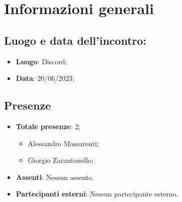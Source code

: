 \section{Informazioni generali}
    \subsection{Luogo e data dell'incontro:}
    \begin{itemize}
        \item \textbf{Luogo}: Discord;
        \item \textbf{Data}: 20/06/2023;
    \end{itemize}
    \subsection{Presenze}
    \begin{itemize}
        \item \textbf{Totale presenze}: 2;
        \begin{itemize}
            \item Alessandro Massarenti;
            \item Giorgio Zarantonello;
        \end{itemize}
        \item \textbf{Assenti}: Nessun assente.
        \item \textbf{Partecipanti esterni}: Nessun partecipante esterno.
    \end{itemize}